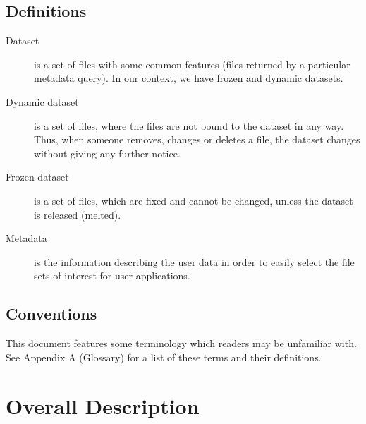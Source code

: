 \documentclass{scrreprt}
\begin{document}
\section{Definitions}
\begin{description}
\item[Dataset] is a set of files with some common features (files returned by a particular metadata query). In our context, we have frozen and dynamic datasets.
\item[Dynamic dataset] is a set of files, where the files are not bound to the dataset in any way. Thus, when someone removes, changes or deletes a file, the dataset changes without giving any further notice.
\item[Frozen dataset] is a set of files, which are fixed and cannot be changed, unless the dataset is released (melted).
\item[Metadata] is the information describing the user data in order to easily select the file sets of interest for user applications.
\end{description}


\section{Conventions}
This document features some terminology which readers may be unfamiliar with. See Appendix A (Glossary) for a list of these terms and their definitions. 



\chapter{Overall Description}
\end{document}
